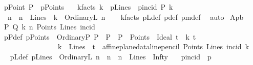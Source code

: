 \begin{isabellebody}
\ \ \ pPoint{\isacharcolon}{\kern0pt}\ {\isachardoublequoteopen}P\ {\isasymin}\ pPoints{\isachardoublequoteclose}\isanewline
\ \ \ k{\isacharunderscore}{\kern0pt}facts{\isacharcolon}{\kern0pt}\ {\isachardoublequoteopen}k\ {\isasymin}\ pLines\ {\isasymand}\ pincid\ P\ k{\isachardoublequoteclose}\ \isanewline
\ \ \ {\isachardoublequoteopen}{\isasymexists}\ n{\isachardot}{\kern0pt}\ \ n\ {\isasymin}\ Lines\ {\isasymand}\ k\ {\isacharequal}{\kern0pt}\ OrdinaryL\ n{\isachardoublequoteclose}\isanewline
%
\isadelimproof
\ \ %
\endisadelimproof
%
\isatagproof
{}\isamarkupfalse%
\ k{\isacharunderscore}{\kern0pt}facts\ pLdef\ p{\isacharunderscore}{\kern0pt}def\ pm{\isacharunderscore}{\kern0pt}def\ \isamarkupfalse%
\ auto%
\endisatagproof
{\isafoldproof}%
%
\isadelimproof
\isanewline
%
\endisadelimproof
\isanewline
{}\isamarkupfalse%
\ Ap{}b{\isacharcolon}{\kern0pt}\isanewline
\ \ \ P\ Q\ k\ n\ Points\ Lines\ incid\isanewline
\ \ \ pPdef{\isacharcolon}{\kern0pt}\ {\isachardoublequoteopen}pPoints\ {\isasymequiv}\ {\isacharbraceleft}{\kern0pt}OrdinaryP\ P\ {\isacharbar}{\kern0pt}\ P\ {\isachardot}{\kern0pt}\ {\isacharparenleft}{\kern0pt}P\ {\isasymin}\ Points{\isacharparenright}{\kern0pt}{\isacharbraceright}{\kern0pt}\ {\isasymunion}\ {\isacharbraceleft}{\kern0pt}Ideal\ t\ {\isacharbar}{\kern0pt}\ k\ t\ {\isachardot}{\kern0pt}\ \isanewline
\ \ \ \ \ \ \ \ \ \ \ \ \ \ \ \ \ \ {\isacharparenleft}{\kern0pt}{\isacharparenleft}{\kern0pt}k\ {\isasymin}\ Lines{\isacharparenright}{\kern0pt}\ {\isasymand}\ {\isacharparenleft}{\kern0pt}t\ {\isacharequal}{\kern0pt}\ affine{\isacharunderscore}{\kern0pt}plane{\isacharunderscore}{\kern0pt}data{\isachardot}{\kern0pt}line{\isacharunderscore}{\kern0pt}pencil\ Points\ Lines\ {\isacharparenleft}{\kern0pt}incid{\isacharparenright}{\kern0pt}\ k{\isacharparenright}{\kern0pt}\ {\isacharparenright}{\kern0pt}{\isacharbraceright}{\kern0pt}{\isachardoublequoteclose}\isanewline
\ \ \ pLdef{\isacharcolon}{\kern0pt}\ {\isachardoublequoteopen}pLines\ {\isasymequiv}\ {\isacharbraceleft}{\kern0pt}OrdinaryL\ n\ {\isacharbar}{\kern0pt}\ n\ {\isachardot}{\kern0pt}\ {\isacharparenleft}{\kern0pt}n\ {\isasymin}\ Lines{\isacharparenright}{\kern0pt}{\isacharbraceright}{\kern0pt}\ {\isasymunion}\ {\isacharbraceleft}{\kern0pt}Infty{\isacharbraceright}{\kern0pt}{\isachardoublequoteclose}\isanewline
\ \ \ pincid\ {\isacharparenleft}{\kern0pt}\ {\isachardoublequoteopen}p{\isasymlhd}{\isachardoublequoteclose}\ {}{}{\isacharparenright}{\kern0pt}\isanewline

\end{isabellebody}
